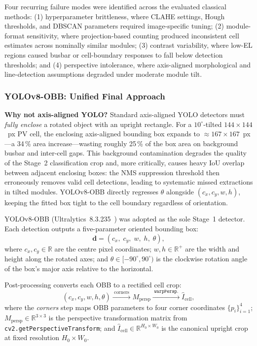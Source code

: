 \documentclass[conference]{IEEEtran}
\begin{document}
Four recurring failure modes were identified across the evaluated classical methods: (1) hyperparameter brittleness, where CLAHE settings, Hough thresholds, and DBSCAN parameters required image-specific tuning; (2) module-format sensitivity, where projection-based counting produced inconsistent cell estimates across nominally similar modules; (3) contrast variability, where low-EL regions caused busbar or cell-boundary responses to fall below detection thresholds; and (4) perspective intolerance, where axis-aligned morphological and line-detection assumptions degraded under moderate module tilt.

\subsubsection{YOLOv8-OBB: Unified Final Approach}
\label{sec:yolo}

\textbf{Why not axis-aligned YOLO?} Standard axis-aligned YOLO detectors must \textit{fully enclose} a rotated object with an upright rectangle. For a $10^\circ$-tilted $144\times144$~px PV cell, the enclosing axis-aligned bounding box expands to $\approx$$\!167\times167$~px---a 34\,\% area increase---wasting roughly 25\,\% of the box area on background busbar and inter-cell gaps. This background contamination degrades the quality of the Stage~2 classification crop and, more critically, causes heavy IoU overlap between adjacent enclosing boxes: the NMS suppression threshold then erroneously removes valid cell detections, leading to systematic missed extractions in tilted modules. YOLOv8-OBB directly regresses $\theta$ alongside $(c_x, c_y, w, h)$, keeping the fitted box tight to the cell boundary regardless of orientation.

YOLOv8-OBB (Ultralytics~8.3.235~\cite{jocher2023}) was adopted as the sole Stage~1 detector. Each detection outputs a five-parameter oriented bounding box:
\begin{equation}
  \mathbf{d} = (c_x,\; c_y,\; w,\; h,\; \theta),
  \label{eq:obb}
\end{equation}
where $c_x, c_y \in \mathbb{R}$ are the centre pixel coordinates; $w, h \in \mathbb{R}^{+}$ are the width and height along the rotated axes; and $\theta \in [-90^\circ, 90^\circ)$ is the clockwise rotation angle of the box's major axis relative to the horizontal.

Post-processing converts each OBB to a rectified cell crop:
\begin{equation}
  (c_x, c_y, w, h, \theta)
  \xrightarrow{\;\text{corners}\;}
  M_{\text{persp}}
  \xrightarrow{\;\texttt{warpPersp.}\;}
  \hat{I}_{\text{cell}},
  \label{eq:postproc}
\end{equation}
where the \textit{corners} step maps OBB parameters to four corner coordinates $\{p_i\}_{i=1}^{4}$; $M_{\text{persp}} \in \mathbb{R}^{3\times3}$ is the perspective transformation matrix from \texttt{cv2.getPerspectiveTransform}; and $\hat{I}_{\text{cell}} \in \mathbb{R}^{H_0 \times W_0}$ is the canonical upright crop at fixed resolution $H_0 \times W_0$.
\end{document}
